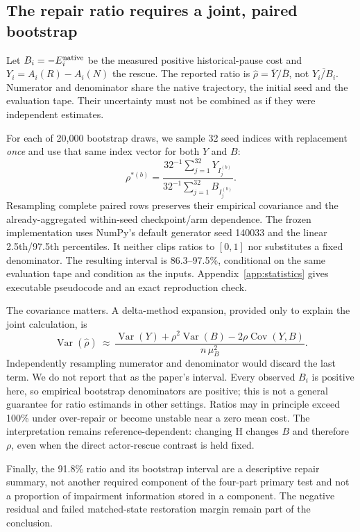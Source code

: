 \subsection{The repair ratio requires a joint, paired bootstrap}\label{m:ratiouncertainty}
Let $B_i=-E_i^{\rm native}$ be the measured positive historical-pause cost and $Y_i=A_i(R)-A_i(N)$ the rescue. The reported ratio is $\hat\rho=\bar Y/\bar B$, not $\overline{Y_i/B_i}$. Numerator and denominator share the native trajectory, the initial seed and the evaluation tape. Their uncertainty must not be combined as if they were independent estimates.

For each of 20{,}000 bootstrap draws, we sample 32 seed indices with replacement \emph{once} and use that same index vector for both $Y$ and $B$:
\begin{equation}
\rho^{*(b)}=\frac{32^{-1}\sum_{j=1}^{32}Y_{I^{(b)}_j}}
{32^{-1}\sum_{j=1}^{32}B_{I^{(b)}_j}}.
\end{equation}
Resampling complete paired rows preserves their empirical covariance and the already-aggregated within-seed checkpoint/arm dependence. The frozen implementation uses NumPy's default generator seed 140033 and the linear 2.5th/97.5th percentiles. It neither clips ratios to $[0,1]$ nor substitutes a fixed denominator. The resulting interval is 86.3--97.5\%, conditional on the same evaluation tape and condition as the inputs. Appendix~\ref{app:statistics} gives executable pseudocode and an exact reproduction check.

The covariance matters. A delta-method expansion, provided only to explain the joint calculation, is
\begin{equation}
\operatorname{Var}(\hat\rho)\ \approx\ \frac{\operatorname{Var}(Y)+\rho^2\operatorname{Var}(B)
-2\rho\operatorname{Cov}(Y,B)}{n\,\mu_B^2}.
\end{equation}
Independently resampling numerator and denominator would discard the last term. We do not report that as the paper's interval. Every observed $B_i$ is positive here, so empirical bootstrap denominators are positive; this is not a general guarantee for ratio estimands in other settings. Ratios may in principle exceed 100\% under over-repair or become unstable near a zero mean cost. The interpretation remains reference-dependent: changing H changes $B$ and therefore $\rho$, even when the direct actor-rescue contrast is held fixed.

Finally, the 91.8\% ratio and its bootstrap interval are a descriptive repair summary, not another required component of the four-part primary test and not a proportion of impairment information stored in a component. The negative residual and failed matched-state restoration margin remain part of the conclusion.
